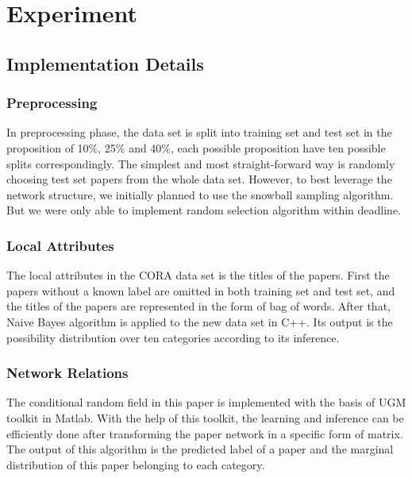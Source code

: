 \documentclass{sig-alternate}
\begin{document}
\section{Experiment}
\subsection{Implementation Details}
\subsubsection{Preprocessing}
In preprocessing phase, the data set is split into training set and test set in the proposition of 10\%, 25\% and 40\%, each possible proposition have ten possible splits correspondingly. The simplest and most straight-forward way is randomly choosing test set papers from the whole data set. However, to best leverage the network structure, we initially planned to use the snowball sampling algorithm\cite{Goodman1961Snowball}. But we were only able to implement random selection algorithm within deadline.

\subsubsection{Local Attributes}
The local attributes in the CORA data set is the titles of the papers. First the papers without a known label are omitted in both training set and test set, and the titles of the papers are represented in the form of bag of words. After that, Naive Bayes algorithm is applied to the new data set in C++. Its output is the possibility distribution over ten categories according to its inference.

\subsubsection{Network Relations}
The conditional random field in this paper is implemented with the basis of UGM toolkit\cite{UGMtoolkit} in Matlab. With the help of this toolkit, the learning and inference can be efficiently done after transforming the paper network in a specific form of matrix. The output of this algorithm is the predicted label of a paper and the marginal distribution of this paper belonging to each category.
\end{document}
